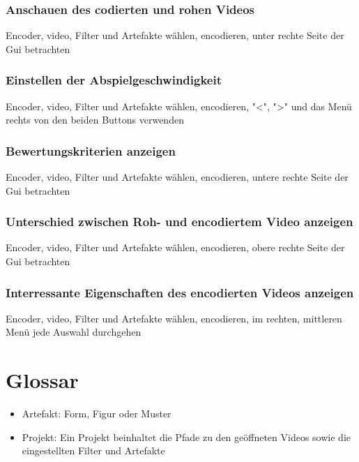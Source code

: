 \documentclass[parskip=full]{scrartcl}
\begin{document}
\subsubsection{Anschauen des codierten und rohen Videos}
Encoder, video, Filter und Artefakte wählen, encodieren, unter rechte Seite der Gui betrachten
\subsubsection{Einstellen der Abspielgeschwindigkeit}
Encoder, video, Filter und Artefakte wählen, encodieren, "<", ">" und das Menü rechts von den beiden Buttons verwenden
\subsubsection{Bewertungskriterien anzeigen}
Encoder, video, Filter und Artefakte wählen, encodieren, untere rechte Seite der Gui betrachten
\subsubsection{Unterschied zwischen Roh- und encodiertem Video anzeigen}
Encoder, video, Filter und Artefakte wählen, encodieren, obere rechte Seite der Gui betrachten
\subsubsection{Interressante Eigenschaften des encodierten Videos anzeigen}
Encoder, video, Filter und Artefakte wählen, encodieren, im rechten, mittleren Menü jede Auswahl durchgehen
\section{Glossar}
\begin{itemize}
\item Artefakt: Form, Figur oder Muster
\item Projekt: Ein Projekt beinhaltet die Pfade zu den geöffneten Videos sowie die eingestellten Filter und Artefakte
\end{itemize}
\end{document}
